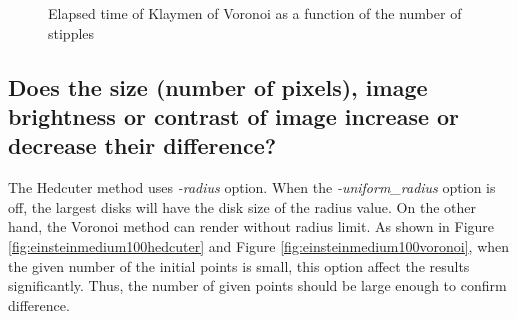 \documentclass[11pt]{article}
\begin{document}
\begin{figure}[hbpt] 
	\begin{center} 
		\hspace{5mm}

		\hspace{5mm}
	\caption{Elapsed time of Klaymen of Voronoi as a function of the number of stipples} 
	\label{fig:einsteinrunningtimevoronoi}
	\end{center} 
\end{figure}


\subsection{Does the size (number of pixels), image brightness or contrast of image increase or decrease their difference?}%
The Hedcuter method uses \textit{-radius} option. When the \textit{-uniform\_radius} option is off, the largest disks will have the disk size of the radius value. On the other hand, the Voronoi method can render without radius limit. As shown in Figure \ref{fig:einsteinmedium100hedcuter} and Figure \ref{fig:einsteinmedium100voronoi}, when the given number of the initial points is small, this option affect the results significantly.  Thus, the number of given points should be large enough to confirm difference.
\end{document}
